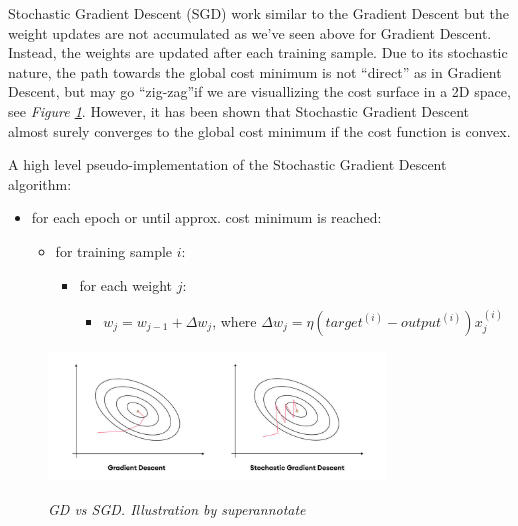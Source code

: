 Stochastic Gradient Descent (SGD) work similar to the Gradient Descent but the weight
updates are not accumulated as we’ve seen above for Gradient Descent. Instead,
the weights are updated after each training sample. Due to its stochastic
nature, the path towards the global cost minimum is not “direct” as in Gradient
Descent, but may go “zig-zag”if we are visuallizing the cost surface in a 2D
space, see \textit{Figure \ref{fig:sgdvsgd}}. However, it has been shown that
Stochastic Gradient Descent almost surely converges to the global cost minimum
if the cost function is convex. \newline

A high level pseudo-implementation of the Stochastic Gradient Descent
algorithm:

\begin{itemize}[label=$\circ$]
  \item for each epoch or until approx. cost minimum is reached:
    \begin{itemize}[label=$\circ$, topsep=0pt]
      \item for training sample \(i\):
        \begin{itemize}[label=$\circ$, topsep=5pt]
          \item for each weight \(j\):
            \begin{itemize}[label=$\circ$, topsep=10pt]
              \item \(w_j = w_{j-1} + \Delta w_j\), where \(\Delta w_j = \eta (target^{(i)} - output^{(i)})x_{j}^{(i)}\)
            \end{itemize}
        \end{itemize}
    \end{itemize}
\end{itemize}

\begin{figure}[H]
  \centering
    \includegraphics[width=0.8\textwidth]{imatges/preliminaries/sgdvsgd.jpeg}
  \caption[GD vs SGD]{\textit{GD vs SGD. Illustration by superannotate}}
  {\label{fig:sgdvsgd}}
\end{figure}

